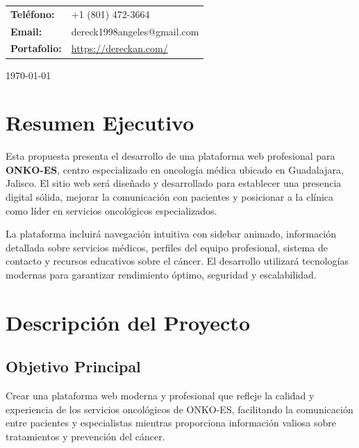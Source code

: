 \documentclass[12pt,a4paper]{article}
\begin{document}
\begin{titlepage}
\begin{center}
{\begin{minipage}{0.8\textwidth}
        \vspace{0.3cm}
        
        \begin{tabular}{ll}
            \textbf{Teléfono:} & +1 (801) 472-3664 \\
            \textbf{Email:} & dereck1998angeles@gmail.com \\
            \textbf{Portafolio:} & \url{https://dereckan.com/} \\
        \end{tabular}
        
        \vspace{0.5cm}
    \end{minipage}}
    \end{center}
    
    \vspace{2cm}
    
    {\large\textcolor{grisclaro}{\today}}
    
\end{titlepage}

\newpage

\section{Resumen Ejecutivo}

Esta propuesta presenta el desarrollo de una plataforma web profesional para \textbf{ONKO-ES}, centro especializado en oncología médica ubicado en Guadalajara, Jalisco. El sitio web será diseñado y desarrollado para establecer una presencia digital sólida, mejorar la comunicación con pacientes y posicionar a la clínica como líder en servicios oncológicos especializados.

La plataforma incluirá navegación intuitiva con sidebar animado, información detallada sobre servicios médicos, perfiles del equipo profesional, sistema de contacto y recursos educativos sobre el cáncer. El desarrollo utilizará tecnologías modernas para garantizar rendimiento óptimo, seguridad y escalabilidad.

\section{Descripción del Proyecto}

\subsection{Objetivo Principal}
Crear una plataforma web moderna y profesional que refleje la calidad y experiencia de los servicios oncológicos de ONKO-ES, facilitando la comunicación entre pacientes y especialistas mientras proporciona información valiosa sobre tratamientos y prevención del cáncer.
\end{document}

